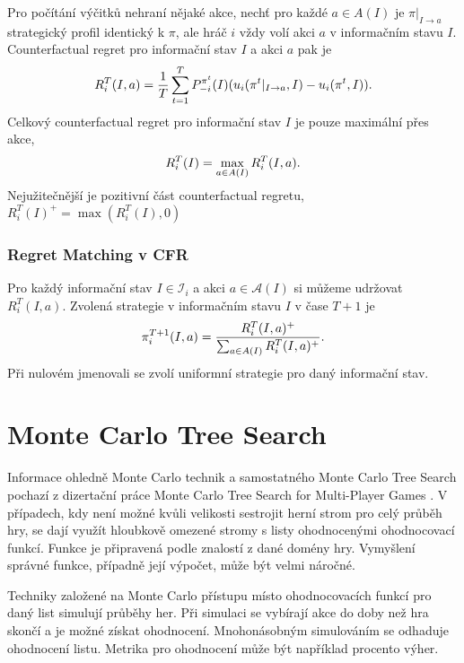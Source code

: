 Pro počítání výčitků nehraní nějaké akce, nechť pro každé $a \in A(I)$ je $\pi|_{I \to a}$ strategický profil identický k $\pi$, ale hráč $i$ vždy volí akci $a$ v informačním stavu $I$. Counterfactual regret pro informační stav $I$ a akci $a$ pak je 
\begin{equation}
    R^T_i(I, a) = \frac{1}{T} \sum^T_{t=1} P^{\pi^t}_{-i}(I)(u_i(\pi^t|_{I \to a}, I) - u_i(\pi^t, I))
\hbox{.}\end{equation}
Celkový counterfactual regret pro informační stav $I$ je pouze maximální přes akce,
\begin{equation}
    R^T_i(I) = \max_{a \in A(I)} R^T_i(I, a) 
\hbox{.}\end{equation}
Nejužitečnější je pozitivní část counterfactual regretu, $R^T_i(I)^+ = \max(R^T_i(I), 0)$

\subsubsection{Regret Matching v CFR}\label{sub:rm}

Pro každý informační stav $I \in \mathcal{I}_i$ a akci $a \in \mathcal{A}(I)$ si můžeme udržovat $R^T_i(I, a)$. Zvolená strategie v informačním stavu $I$ v čase $T+1$ je
\begin{equation}
    \pi^{T+1}_i(I, a) = \frac{R^T_i(I, a)^+}{\sum_{a \in A(I)} R^T_i(I,a)^+}
\hbox{.}\end{equation}  
Při nulovém jmenovali se zvolí uniformní strategie pro daný informační stav.

\section{Monte Carlo Tree Search}\label{sec:mcts}
Informace ohledně Monte Carlo technik a samostatného Monte Carlo Tree Search pochazí z dizertační práce Monte Carlo Tree Search for Multi-Player Games \cite{Soete2013MonteCarloTS}.
V případech, kdy není možné kvůli velikosti sestrojit herní strom pro celý průběh hry, se dají využít hloubkově omezené stromy s listy ohodnocenými ohodnocovací funkcí. Funkce je připravená podle znalostí z dané domény hry. Vymyšlení správné funkce, případně její výpočet, může být velmi náročné. 

Techniky založené na Monte Carlo přístupu místo ohodnocovacích funkcí pro daný list simulují průběhy her. Při simulaci se vybírají akce do doby než hra skončí a je možné získat ohodnocení. Mnohonásobným simulováním se odhaduje ohodnocení listu. Metrika pro ohodnocení může být například procento výher.

